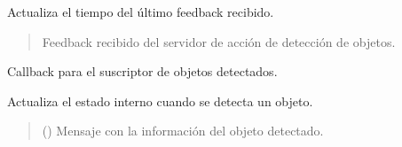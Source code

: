\documentclass[a4paper,10pt,spanish]{sphinxmanual}
\begin{document}
\begin{fulllineitems}
\begin{fulllineitems}
\sphinxAtStartPar
Actualiza el tiempo del último feedback recibido.
\begin{quote}\begin{description}
\sphinxAtStartPar
{} \textendash{} Feedback recibido del servidor de acción de detección de objetos.

\end{description}\end{quote}

\end{fulllineitems}


\begin{fulllineitems}
\label{\detokenize{squad_state_manager:squad_state_manager.EstadoExploracion.object_callback}}
\pysigstartsignatures
{}
\pysigstopsignatures
\sphinxAtStartPar
Callback para el suscriptor de objetos detectados.

\sphinxAtStartPar
Actualiza el estado interno cuando se detecta un objeto.
\begin{quote}\begin{description}
\sphinxAtStartPar
{} () \textendash{} Mensaje con la información del objeto detectado.

\end{description}\end{quote}

\end{fulllineitems}


\end{fulllineitems}

\end{document}
